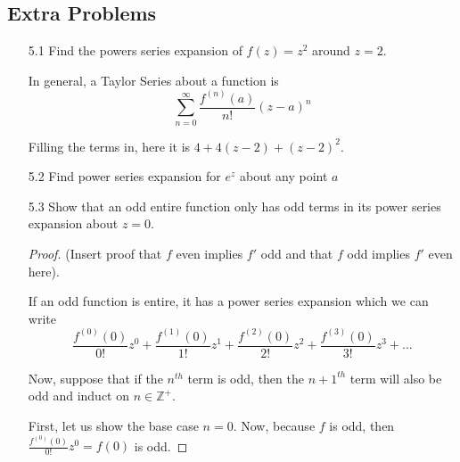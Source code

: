 \documentclass[11pt]{article}
\begin{document}
\subsection{Extra Problems}
\begin{enumerate}
	\item[5.1] Find the powers series expansion of $f(z) = z^2$ around $z = 2$.
	
	In general, a Taylor Series about a function is 
	\[\sum^{\infty}_{n=0} \frac{f^{(n)}(a)}{n!}(z-a)^n \]
	
	Filling the terms in, here it is $4 + 4(z-2) + (z-2)^2$.
	
	\item[5.2] Find power series expansion for $e^z$ about any point $a$
	
	\item[5.3] Show that an odd entire function only has odd terms in its power series expansion about $z = 0$. 
	
	\begin{proof}
		(Insert proof that $f$ even implies $f'$ odd and that $f$ odd implies $f'$ even here).
		
		If an odd function is entire, it has a power series expansion which we can write
		\[
		\frac{f^{(0)}(0)}{0!}z^0 +
		\frac{f^{(1)}(0)}{1!}z^1 +
		\frac{f^{(2)}(0)}{2!}z^2 + 
		\frac{f^{(3)}(0)}{3!}z^3 + ... \]
		
		Now, suppose that if the $n^{th}$ term is odd, then the $n + 1^{th}$ term will also be odd and induct on $n \in \mathbb{Z}^+$.
		
		First, let us show the base case $n = 0$. Now, because $f$ is odd, then $\frac{f^{(0)}(0)}{0!}z^0 = f(0)$ is odd.
	\end{proof}
\end{enumerate}
\end{document}
